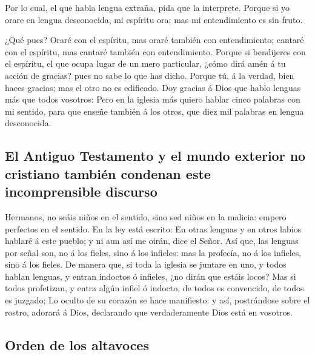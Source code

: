  Por lo cual, el que habla lengua extraña, pida que la
interprete.  Porque si yo orare en lengua desconocida, mi
espíritu ora; mas mi entendimiento es sin fruto.

 ¿Qué pues? Oraré con el espíritu, mas oraré también con
entendimiento; cantaré con el espíritu, mas cantaré también con
entendimiento.  Porque si bendijeres con el espíritu, el
que ocupa lugar de un mero particular, ¿cómo dirá amén á tu acción de
gracias? pues no sabe lo que has dicho.  Porque tú, á la
verdad, bien haces gracias; mas el otro no es edificado. 
Doy gracias á Dios que hablo lenguas más que todos vosotros:
 Pero en la iglesia más quiero hablar cinco palabras con
mi sentido, para que enseñe también á los otros, que diez mil palabras
en lengua desconocida.

\hypertarget{el-antiguo-testamento-y-el-mundo-exterior-no-cristiano-tambiuxe9n-condenan-este-incomprensible-discurso}{%
\subsection{El Antiguo Testamento y el mundo exterior no cristiano
también condenan este incomprensible
discurso}\label{el-antiguo-testamento-y-el-mundo-exterior-no-cristiano-tambiuxe9n-condenan-este-incomprensible-discurso}}

 Hermanos, no seáis niños en el sentido, sino sed niños
en la malicia: empero perfectos en el sentido.  En la ley
está escrito: En otras lenguas y en otros labios hablaré á este pueblo;
y ni aun así me oirán, dice el Señor.  Así que, las
lenguas por señal son, no á los fieles, sino á los infieles: mas la
profecía, no á los infieles, sino á los fieles.  De
manera que, si toda la iglesia se juntare en uno, y todos hablan
lenguas, y entran indoctos ó infieles, ¿no dirán que estáis locos?
 Mas si todos profetizan, y entra algún infiel ó indocto,
de todos es convencido, de todos es juzgado;  Lo oculto
de su corazón se hace manifiesto: y así, postrándose sobre el rostro,
adorará á Dios, declarando que verdaderamente Dios está en vosotros.

\hypertarget{orden-de-los-altavoces}{%
\subsection{Orden de los altavoces}\label{orden-de-los-altavoces}}

